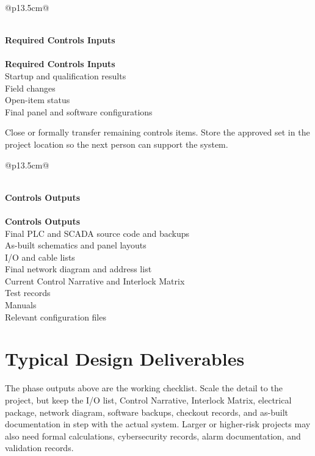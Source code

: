 \begin{longtable}{@{}p{13.5cm}@{}}
\caption{Stage 8 --- Required Controls Inputs}\label{tab:stage8-inputs} \\
\toprule
{}\textbf{Required Controls Inputs} \\
\midrule
\endfirsthead
{} \\
\toprule
{}\textbf{Required Controls Inputs} \\
\midrule
\endhead
Startup and qualification results \\
Field changes \\
Open-item status \\
Final panel and software configurations \\
\bottomrule
\end{longtable}

Close or formally transfer remaining controls items. Store the approved set in the project location so the next person can support the system.

\begin{longtable}{@{}p{13.5cm}@{}}
\caption{Stage 8 --- Controls Outputs}\label{tab:stage8-outputs} \\
\toprule
{}\textbf{Controls Outputs} \\
\midrule
\endfirsthead
{} \\
\toprule
{}\textbf{Controls Outputs} \\
\midrule
\endhead
Final PLC and SCADA source code and backups \\
As-built schematics and panel layouts \\
I/O and cable lists \\
Final network diagram and address list \\
Current Control Narrative and Interlock Matrix \\
Test records \\
Manuals \\
Relevant configuration files \\
\bottomrule
\end{longtable}

\section{Typical Design Deliverables}
The phase outputs above are the working checklist. Scale the detail to the project, but keep the I/O list, Control Narrative, Interlock Matrix, electrical package, network diagram, software backups, checkout records, and as-built documentation in step with the actual system. Larger or higher-risk projects may also need formal calculations, cybersecurity records, alarm documentation, and validation records.

